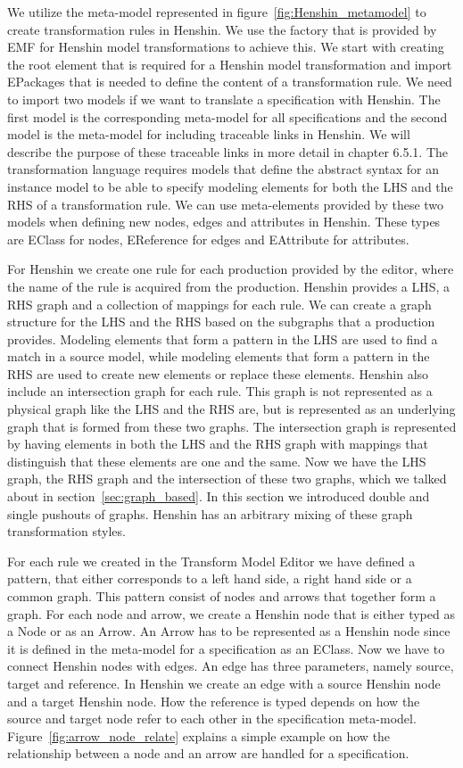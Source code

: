 We utilize the meta-model represented in figure~\ref{fig:Henshin_metamodel} to
create transformation rules in Henshin.  We use the factory that is provided by
EMF for Henshin model transformations to achieve this.
We start with creating the root element that is required for a Henshin model
transformation and import EPackages that is needed to define the content of a
transformation rule. We need to import two models if we want to translate a
specification with Henshin. The first model is the corresponding meta-model for
all specifications and the second model is the meta-model for including
traceable links in Henshin. We will describe the purpose of these traceable
links in more detail in chapter 6.5.1. The transformation language requires
models that define the abstract syntax for an instance model to be able to
specify modeling elements for both the LHS and the RHS of a transformation
rule. We can use meta-elements provided by these two models when defining new
nodes, edges and attributes in Henshin. These types are EClass for nodes,
EReference for edges and EAttribute for attributes. 

For Henshin we create one rule for each production provided by the editor, where
the name of the rule is acquired from the production. Henshin
provides a LHS, a RHS graph and a collection of mappings for each rule. We can
create a graph structure for the LHS and the RHS based on the subgraphs that a
production provides. Modeling elements that form a pattern in the LHS are used
to find a match in a source model, while modeling elements that form a pattern
in the RHS are used to create new elements or replace these elements. Henshin
also include an intersection graph for each rule. This graph is not represented
as a physical graph like the LHS and the RHS are, but is represented as an
underlying graph that is formed from these two graphs. The intersection graph is
represented by having elements in both the LHS and the RHS graph with mappings
that distinguish that these elements are one and the same. Now we have the LHS
graph, the RHS graph and the intersection of these two graphs, which we talked
about in section~\ref{sec:graph_based}. In this section we introduced double
and single pushouts of graphs. Henshin has an arbitrary mixing of these graph
transformation styles.

For each rule we created in the Transform Model Editor we have defined a
pattern, that either corresponds to a left hand side, a right hand side or a
common graph. This pattern consist of nodes and arrows that together form a
graph. For each node and arrow, we create a Henshin node that is either typed
as a Node or as an Arrow. An Arrow has to be represented as a Henshin node since
it is defined in the meta-model for a specification as an EClass. Now we have to
connect Henshin nodes with edges. An edge has three parameters, namely source,
target and reference. In Henshin we create an edge with a source Henshin node
and a target Henshin node. How the reference is typed depends on how the
source and target node refer to each other in the specification meta-model.
Figure~\ref{fig:arrow_node_relate} explains a simple example on how
the relationship between a node and an arrow are handled for a specification.

